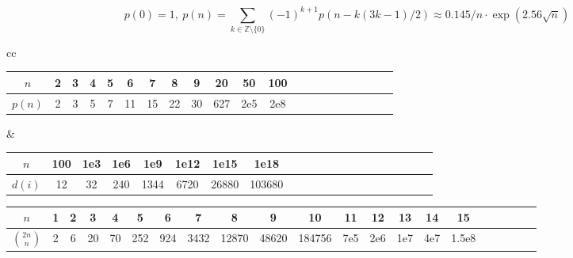 \[
  p(0) = 1,\ p(n) = \sum_{k \in \mathbb Z \setminus \{0\}}{(-1)^{k+1} p(n - k(3k-1) / 2)}
  \approx 0.145 / n \cdot \exp(2.56 \sqrt{n})
\]

{
  \setlength{\tabcolsep}{1pt}
  \setlength{\columnsep}{0pt}

  \noindent
  \begin{tabular}{cc}
    \begin{tabular}{@{}c|*{20}{c@{\ }}@{}}
      $n$    & 2 & 3 & 4 & 5 & 6  & 7  & 8  & 9  & 20  & 50  & 100 \\
      \hline
      $p(n)$ & 2 & 3 & 5 & 7 & 11 & 15 & 22 & 30 & 627 & 2e5 & 2e8 \\
    \end{tabular}
      &
      \begin{tabular}{@{}c|*{20}{c@{\ }}@{}}
        $n$
  & 100 & 1e3 & 1e6 & 1e9  & 1e12 & 1e15  & 1e18 \\
  \hline
  $d(i)$ %
  & 12  & 32  & 240 & 1344 & 6720 & 26880 & 103680 \\
      \end{tabular}
  \end{tabular}


  \begin{tabular}{c|*{20}c}
    $n$             & 1 & 2 & 3  & 4  & 5   & 6   & 7    & 8     & 9
                    & 10     & 11  & 12  & 13  & 14  & 15 \\
                    \hline
    $\binom{2n}{n}$ & 2 & 6 & 20 & 70 & 252 & 924 & 3432 & 12870 & 48620
                    & 184756 & 7e5 & 2e6 & 1e7 & 4e7 & 1.5e8 \\
  \end{tabular}
}
